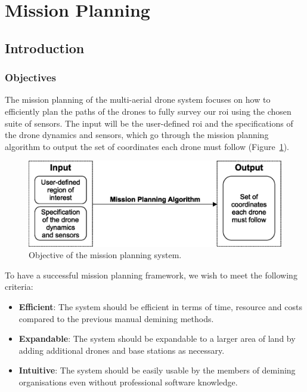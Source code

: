 \newpage
{}
\section{Mission Planning} \label{sec:missionplanning}

\subsection{Introduction}
\label{sec:msp_introduction}

\subsubsection{Objectives}

The mission planning of the multi-aerial drone system focuses on how to efficiently plan the paths of the drones to fully survey our \gls{roi} using the chosen suite of sensors. The input will be the user-defined \gls{roi} and the specifications of the drone dynamics and sensors, which go through the mission planning algorithm to output the set of coordinates each drone must follow (Figure~\ref{fig:msp_objective}).

\begin{figure}[h]
    \centering
    \includegraphics[width=0.7\linewidth]{figs/Jihwan/Objective of the Mission Planning System.eps}
    \caption[Objective of the Mission Planning System]
    {Objective of the mission planning system.}
    \label{fig:msp_objective}
\end{figure}

To have a successful mission planning framework, we wish to meet the following criteria:

\begin{itemize}
    \item \textbf{Efficient}: The system should be efficient in terms of time, resource and costs compared to the previous manual demining methods. 
    \item \textbf{Expandable}: The system should be expandable to a larger area of land by adding additional drones and base stations as necessary. 
    \item \textbf{Intuitive}: The system should be easily usable by the members of demining organisations even without professional software knowledge. 
\end{itemize}


